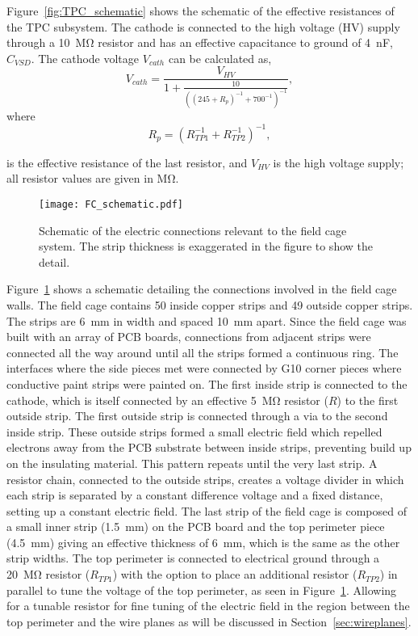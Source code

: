 Figure~\ref{fig:TPC_schematic} shows the schematic of the effective resistances of the TPC subsystem. The cathode is connected to the high voltage (HV) supply through a \SI{10}{\mega\ohm} resistor and has an effective capacitance to ground of \SI{4}{\nano\farad}, $C_{VSD}$. The cathode voltage $V_{cath}$ can be calculated as,
\begin{equation}
V_{cath} = \frac{V_{HV}}{ 1 + \frac{10}{ \left( (245 + R_p)^{-1} + 700^{-1} \right)^{-1} } },
\end{equation}
where 
\begin{equation}
R_p = \left( R_{TP1}^{-1} + R_{TP2}^{-1} \right)^{-1},
 \label{eq:Reff}
\end{equation} 

is the effective resistance of the last resistor, and $V_{HV}$ is the high voltage supply; all resistor values are given in \si{\mega\ohm}.


\begin{figure}[!htb]
\centering
\texttt{[image: FC\_schematic.pdf]}
\caption{Schematic of the electric connections relevant to the field cage system. The strip thickness is exaggerated in the figure to show the detail.}
\label{fig:FC_schematic}
\end{figure}

Figure~\ref{fig:FC_schematic} shows a schematic detailing the connections involved in the field cage walls. The field cage contains 50 inside copper strips and 49 outside copper strips. The strips are \SI{6}{\milli\metre} in width and spaced \SI{10}{\milli\metre} apart. Since the field cage was built with an array of PCB boards, connections from adjacent strips were connected all the way around until all the strips formed a continuous ring. The interfaces where the side pieces met were connected by G10 corner pieces where conductive paint strips were painted on. The first inside strip is connected to the cathode, which is itself connected by an effective \SI{5}{\mega\ohm} resistor ($R$) to the first outside strip. The first outside strip is connected through a via to the second inside strip. These outside strips formed a small electric field which repelled electrons away from the PCB substrate between inside strips, preventing build up on the insulating material. This pattern repeats until the very last strip. A resistor chain, connected to the outside strips, creates a voltage divider in which each strip is separated by a constant difference voltage and a fixed distance, setting up a constant electric field. The last strip of the field cage is composed of a small inner strip  (\SI{1.5}{\milli\metre}) on the PCB board and the top perimeter piece (\SI{4.5}{\milli\metre}) giving an  effective thickness of \SI{6}{\milli\metre}, which is the same as the other strip widths. The top perimeter is connected to electrical ground through a \SI{20}{\mega\ohm} resistor ($R_{TP1}$) with the option to place an additional resistor ($R_{TP2}$) in parallel to tune the voltage of the top perimeter, as seen in Figure~\ref{fig:FC_schematic}. Allowing for a tunable resistor for fine tuning of the electric field in the region between the top perimeter and the wire planes as will be discussed in Section~\ref{sec:wireplanes}. 

